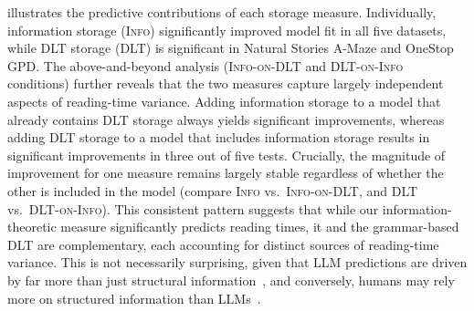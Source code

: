 \documentclass[11pt]{article}
\newcommand{\pmi}{\ensuremath{\operatorname{pmi}}\xspace}
\newcommand{\DLT}{\textcolor{cudOrange}{\textsc{DLT}}\xspace}
\newcommand{\InfoDLT}{\textcolor{cudBrightOrange}{\textsc{DLT}-\textsc{on}-\textsc{Info}}\xspace}
\newcommand{\Info}{\textcolor{cudBlue}{\textsc{Info}}\xspace}
\newcommand{\DLTInfo}{\textcolor{cudSkyBlue}{\textsc{Info}-\textsc{on}-\textsc{DLT}}\xspace}
\newcommand{\dll}{\ensuremath{\Delta_{\mathit{LL}}}\xspace}
\begin{document}
 illustrates the predictive contributions of each storage measure.
Individually, information storage (\Info) significantly improved model fit in all five datasets, while DLT storage (\DLT) is significant in Natural Stories A-Maze and OneStop GPD.
The above-and-beyond analysis (\DLTInfo and \InfoDLT conditions) further reveals that the two measures capture largely independent aspects of reading-time variance.
Adding information storage to a model that already contains DLT storage always yields significant improvements, whereas adding DLT storage to a model that includes information storage results in significant improvements in three out of five tests.
Crucially, the magnitude of improvement for one measure remains largely stable regardless of whether the other is included in the model (compare \Info vs.\ \DLTInfo, and \DLT vs.\ \InfoDLT).
This consistent pattern suggests that while our information-theoretic measure significantly predicts reading times, it and the grammar-based DLT are complementary, each accounting for distinct sources of reading-time variance.
This is not necessarily surprising, given that LLM predictions are driven by far more than just structural information~\citep{hu2026can,mcgee-etal-2026}, and conversely, humans may rely more on structured information than LLMs~\citep{kajikawa-isono-ur}.

\end{document}
